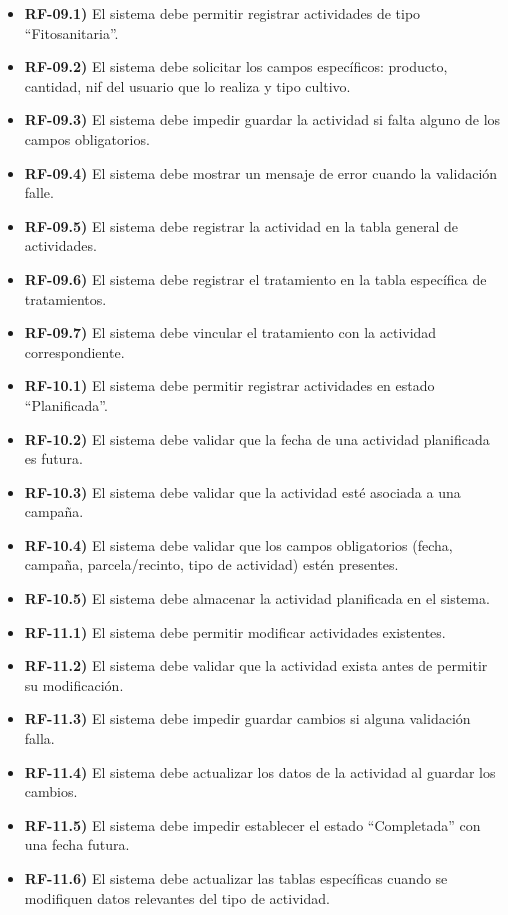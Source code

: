 \begin{itemize}
\begin{itemize}
    \end{itemize}
    \item \textbf{RF-09.1)} El sistema debe permitir registrar actividades de tipo ``Fitosanitaria''.
    \item \textbf{RF-09.2)} El sistema debe solicitar los campos específicos: producto, cantidad, nif del usuario que lo realiza y tipo cultivo.
    \item \textbf{RF-09.3)} El sistema debe impedir guardar la actividad si falta alguno de los campos obligatorios.
    \item \textbf{RF-09.4)} El sistema debe mostrar un mensaje de error cuando la validación falle.
    \item \textbf{RF-09.5)} El sistema debe registrar la actividad en la tabla general de actividades.
    \item \textbf{RF-09.6)} El sistema debe registrar el tratamiento en la tabla específica de tratamientos.
    \item \textbf{RF-09.7)} El sistema debe vincular el tratamiento con la actividad correspondiente.
    \item \textbf{RF-10.1)} El sistema debe permitir registrar actividades en estado “Planificada”.
    \item \textbf{RF-10.2)} El sistema debe validar que la fecha de una actividad planificada es futura.
    \item \textbf{RF-10.3)} El sistema debe validar que la actividad esté asociada a una campaña.
    \item \textbf{RF-10.4)} El sistema debe validar que los campos obligatorios (fecha, campaña, parcela/recinto, tipo de actividad) estén presentes.
    \item \textbf{RF-10.5)} El sistema debe almacenar la actividad planificada en el sistema.
    \item \textbf{RF-11.1)} El sistema debe permitir modificar actividades existentes.
    \item \textbf{RF-11.2)} El sistema debe validar que la actividad exista antes de permitir su modificación.
    \item \textbf{RF-11.3)} El sistema debe impedir guardar cambios si alguna validación falla.
    \item \textbf{RF-11.4)} El sistema debe actualizar los datos de la actividad al guardar los cambios.
    \item \textbf{RF-11.5)} El sistema debe impedir establecer el estado ``Completada'' con una fecha futura.
    \item \textbf{RF-11.6)} El sistema debe actualizar las tablas específicas cuando se modifiquen datos relevantes del tipo de actividad.

\end{itemize}
